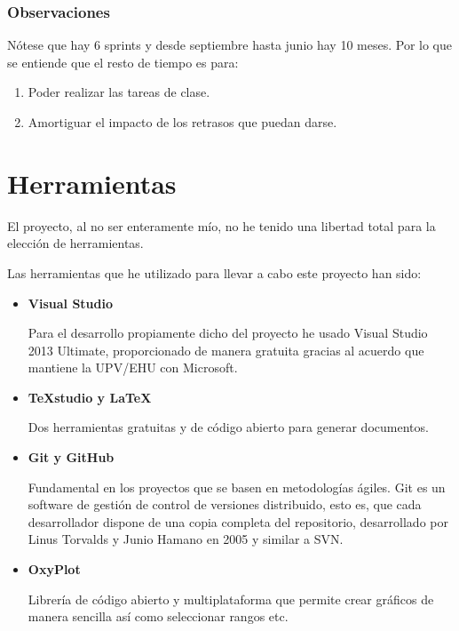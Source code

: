 \subsubsection{Observaciones}
N\'{o}tese que hay 6 sprints y desde septiembre hasta junio hay 10 meses. Por lo que se entiende que el resto de tiempo es para:
\begin{enumerate}
    \item Poder realizar las tareas de clase.
    \item Amortiguar el impacto de los retrasos que puedan darse.
\end{enumerate}

\section{Herramientas}
El proyecto, al no ser enteramente mío, no he tenido una libertad total para la elección de herramientas. 

Las herramientas que he utilizado para llevar a cabo este proyecto han sido:
\begin{itemize}
    \item 
    \textbf{Visual Studio}
    
    Para el desarrollo propiamente dicho del proyecto he usado Visual Studio 2013 Ultimate, proporcionado de manera gratuita gracias al acuerdo que mantiene la UPV/EHU con Microsoft.
    
    \item 
    \textbf{TeXstudio y \LaTeX}
    
    Dos herramientas gratuitas y de código abierto para generar documentos.
    
    \item
    \textbf{Git y GitHub}
    
    Fundamental en los proyectos que se basen en metodologías ágiles. Git es un software de gestión de control de versiones distribuido, esto es, que cada desarrollador dispone de una copia completa del repositorio, desarrollado por Linus Torvalds y Junio Hamano en 2005 y similar a SVN.
    
    \item
    \textbf{OxyPlot}
    
    Librer\'{i}a de c\'{o}digo abierto y multiplataforma que permite crear gr\'{a}ficos de manera sencilla as\'{i} como seleccionar rangos etc.
    
\end{itemize}

